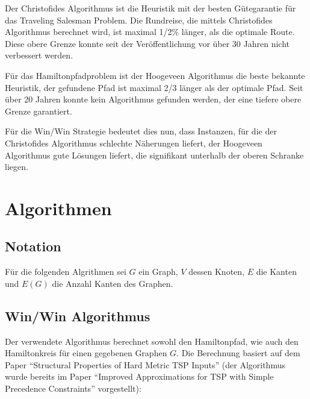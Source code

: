 \documentclass[11pt,a4paper]{article}
\begin{document}
Der Christofides Algorithmus ist die Heuristik mit der besten Gütegarantie für das Traveling Salesman Problem. Die Rundreise, die mittels Christofides Algorithmus berechnet wird, ist maximal 1/2\% länger, als die optimale Route. Diese obere Grenze konnte seit der Veröffentlichung vor über 30 Jahren nicht verbessert werden.

Für das Hamiltonpfadproblem ist der Hoogeveen Algorithmus die beste bekannte Heuristik, der gefundene Pfad ist maximal 2/3 länger als der optimale Pfad. Seit über 20 Jahren konnte kein Algorithmus gefunden werden, der eine tiefere obere Grenze garantiert.\cite{moemke11}

Für die Win/Win Strategie bedeutet dies nun, dass Instanzen, für die der Christofides Algorithmus schlechte Näherungen liefert, der Hoogeveen Algorithmus gute Lösungen liefert, die signifikant unterhalb der oberen Schranke liegen.

\newpage
\section{Algorithmen}
\label{s:algorithmen}
\subsection{Notation}
Für die folgenden Algrithmen sei $G$ ein Graph, $V$ dessen Knoten, $E$ die Kanten und $E(G)$ die Anzahl Kanten des Graphen.

\subsection{Win/Win Algorithmus}
Der verwendete Algorithmus berechnet sowohl den Hamiltonpfad, wie auch den Hamiltonkreis für einen gegebenen Graphen $G$. 
Die Berechnung basiert auf dem Paper "`Structural Properties of Hard Metric TSP Inputs"'\cite{moemke11} (der Algorithmus wurde bereits im Paper "`Improved Approximations for TSP with Simple Precedence Constraints"'\cite{boeckenhauer10} vorgestellt):
\end{document}
